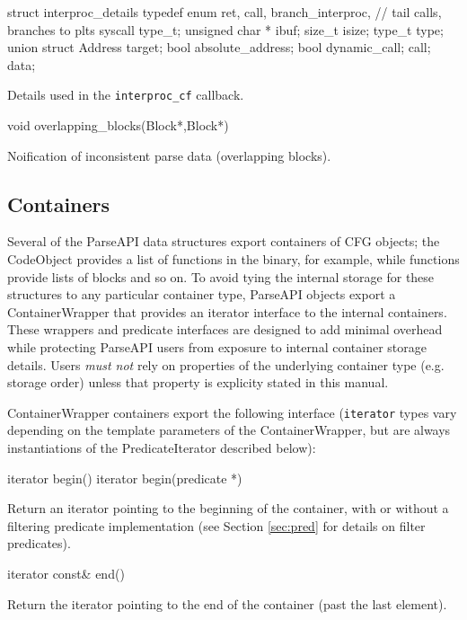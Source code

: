 \documentclass{article}
\newenvironment{apient}{\small\verbatim}{\endverbatim}
\newcommand{\apidesc}[1]{%
{\addtolength{\leftskip}{4em}%
#1\par\medskip}
}
\begin{document}
\begin{apient}  
struct interproc_details {
    typedef enum {
        ret,
        call,
        branch_interproc, // tail calls, branches to plts
        syscall
    } type_t;
    unsigned char * ibuf;
    size_t isize;
    type_t type;
    union {
        struct {
            Address target;
            bool absolute_address;
            bool dynamic_call;
        } call;
    } data;
}
\end{apient}
\apidesc{Details used in the \texttt{interproc\_cf} callback.}

\begin{apient}
void overlapping_blocks(Block*,Block*)
\end{apient}
\apidesc{Noification of inconsistent parse data (overlapping blocks).}

\subsection{Containers}
\label{sec:containers}

Several of the ParseAPI data structures export containers of CFG objects; the
CodeObject provides a list of functions in the binary, for example, while
functions provide lists of blocks and so on. To avoid tying the internal
storage for these structures to any particular container type, ParseAPI objects
export a ContainerWrapper that provides an iterator interface to the internal
containers. These wrappers and predicate interfaces are designed to add minimal
overhead while protecting ParseAPI users from exposure to internal container
storage details. Users \emph{must not} rely on properties of the underlying
container type (e.g. storage order) unless that property is explicity stated in
this manual.

\noindent
ContainerWrapper containers export the following interface (\texttt{iterator} types vary depending on the template parameters of the ContainerWrapper, but are always instantiations of the PredicateIterator described below):

\begin{apient}
iterator begin()
iterator begin(predicate *)
\end{apient}
\apidesc{Return an iterator pointing to the beginning of the container, with or without a filtering predicate implementation (see Section \ref{sec:pred} for details on filter predicates).}

\begin{apient}
iterator const& end()
\end{apient}
\apidesc{Return the iterator pointing to the end of the container (past the last element).}
\end{document}

